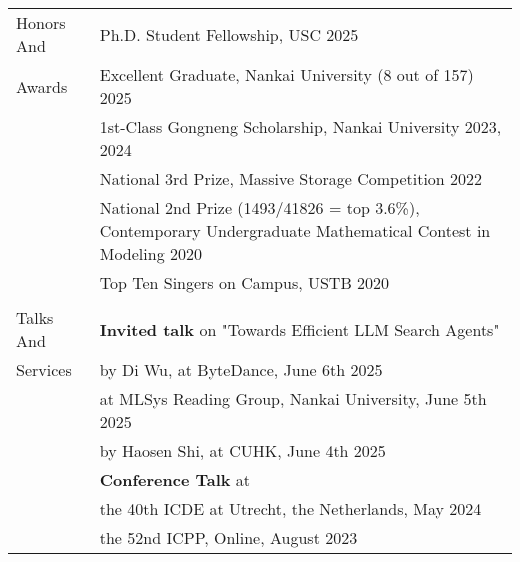 \documentclass[letterpaper, 10pt]{article}
\begin{document}
\begin{longtable}{p{}p{}}
\nohyphens{\textcolor{OliveGreen}{Honors And}}
& Ph.D. Student Fellowship, USC \hfill 2025 \\
\nohyphens{\textcolor{OliveGreen}{Awards}}
& Excellent Graduate, Nankai University (\textcolor[RGB]{200, 0, 0}{8 out of 157}) \hfill 2025 \\
& 1st-Class Gongneng Scholarship, Nankai University \hfill 2023, 2024 \\
& National 3rd Prize, Massive Storage Competition \hfill 2022 \\
& National 2nd Prize (\textcolor[RGB]{200, 0, 0}{1493/41826 = top 3.6\%}), Contemporary Undergraduate Mathematical Contest in Modeling \hfill 2020 \\
& Top Ten Singers on Campus, USTB \hfill 2020 \\
& \\
 

\nohyphens{\textcolor{OliveGreen}{Talks And}}
& \textbf{Invited talk} on "Towards Efficient LLM Search Agents" \\
\nohyphens{\textcolor{OliveGreen}{Services}} 
& \quad\quad by Di Wu, at ByteDance, June 6th 2025 \\
& \quad\quad at MLSys Reading Group, Nankai University, June 5th 2025 \\
& \quad\quad by Haosen Shi, at CUHK, June 4th 2025 
\vspace{0.01\textwidth} \\

& \textbf{Conference Talk} at \\
& \quad\quad the 40th ICDE at Utrecht, the Netherlands, May 2024 \\
& \quad\quad the 52nd ICPP, Online, August 2023
\vspace{0.01\textwidth} \\


\end{longtable}
\end{document}

